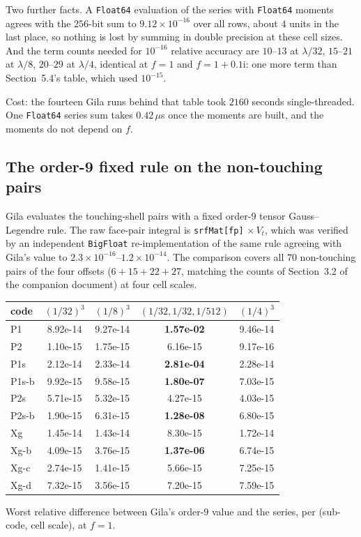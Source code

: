 \documentclass[11pt]{article}
\theoremstyle{remark}
\newcommand{\ii}{\mathrm{i}}
\newcommand{\code}[1]{\texttt{#1}}
\begin{document}
Two further facts. A \code{Float64} evaluation of the series with \code{Float64} moments
agrees with the $256$-bit sum to $9.12\times10^{-16}$ over all rows, about $4$ units in the
last place, so nothing is lost by summing in double precision at these cell sizes. And the
term counts needed for $10^{-16}$ relative accuracy are $10$--$13$ at $\lambda/32$,
$15$--$21$ at $\lambda/8$, $20$--$29$ at $\lambda/4$, identical at $f = 1$ and
$f = 1+0.1\ii$: one more term than Section~5.4's table, which used $10^{-15}$.

Cost: the fourteen Gila runs behind that table took $2160$ seconds single-threaded. One
\code{Float64} series sum takes $0.42\,\mu$s once the moments are built, and the moments do
not depend on $f$.

\subsection{The order-9 fixed rule on the non-touching pairs}

Gila evaluates the touching-shell pairs with a fixed order-$9$ tensor Gauss--Legendre rule.
The raw face-pair integral is \code{srfMat[fp]}$\,\times V_t$, which was verified by an
independent \code{BigFloat} re-implementation of the same rule agreeing with Gila's value
to $2.3\times10^{-16}$--$1.2\times10^{-14}$. The comparison covers all $70$ non-touching
pairs of the four offsets ($6 + 15 + 22 + 27$, matching the counts of Section~3.2 of the
companion document) at four cell scales.

\begin{center}\small
\begin{tabular}{@{}lcccc@{}}
\toprule
code & $(1/32)^3$ & $(1/8)^3$ & $(1/32,1/32,1/512)$ & $(1/4)^3$\\
\midrule
P1    & 8.92e-14 & 9.27e-14 & \textbf{1.57e-02} & 9.46e-14\\
P2    & 1.10e-15 & 1.75e-15 & 6.16e-15 & 9.17e-16\\
P1s   & 2.12e-14 & 2.33e-14 & \textbf{2.81e-04} & 2.28e-14\\
P1s-b & 9.92e-15 & 9.58e-15 & \textbf{1.80e-07} & 7.03e-15\\
P2s   & 5.71e-15 & 5.32e-15 & 4.27e-15 & 4.03e-15\\
P2s-b & 1.90e-15 & 6.31e-15 & \textbf{1.28e-08} & 6.80e-15\\
Xg    & 1.45e-14 & 1.43e-14 & 8.30e-15 & 1.72e-14\\
Xg-b  & 4.09e-15 & 3.76e-15 & \textbf{1.37e-06} & 6.74e-15\\
Xg-c  & 2.74e-15 & 1.41e-15 & 5.66e-15 & 7.25e-15\\
Xg-d  & 7.32e-15 & 3.56e-15 & 7.20e-15 & 7.59e-15\\
\bottomrule
\end{tabular}
\end{center}
\noindent
Worst relative difference between Gila's order-$9$ value and the series, per (sub-code,
cell scale), at $f = 1$.
\end{document}
